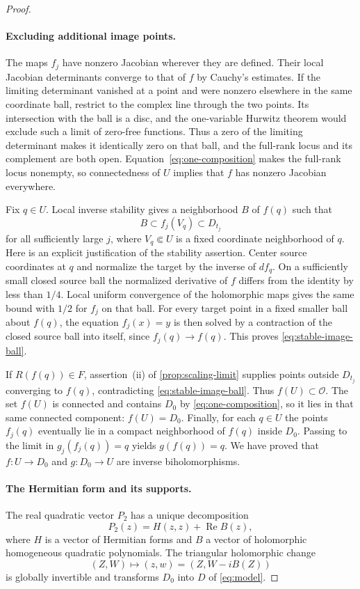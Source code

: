\begin{proof}
\paragraph{Excluding additional image points.}
The maps $f_j$ have nonzero Jacobian wherever they are defined.  Their local Jacobian determinants converge to that of $f$ by Cauchy's estimates. If the limiting determinant vanished at a point and were nonzero elsewhere in the same coordinate ball, restrict to the complex line through the two points. Its intersection with the ball is a disc, and the one-variable Hurwitz theorem would exclude such a limit of zero-free functions. Thus a zero of the limiting determinant makes it identically zero on that ball, and the full-rank locus and its complement are both open. Equation~\eqref{eq:one-composition} makes the full-rank locus nonempty, so connectedness of $U$ implies that $f$ has nonzero Jacobian everywhere.

Fix $q\in U$.  Local inverse stability gives a neighborhood $B$ of $f(q)$ such that
\begin{equation}
\label{eq:stable-image-ball}
 B\subset f_j(V_q)\subset D_{t_j}
\end{equation}
for all sufficiently large $j$, where $V_q\Subset U$ is a fixed coordinate neighborhood of $q$.  Here is an explicit justification of the stability assertion.  Center source coordinates at $q$ and normalize the target by the inverse of $df_q$.  On a sufficiently small closed source ball the normalized derivative of $f$ differs from the identity by less than $1/4$.  Local uniform convergence of the holomorphic maps gives the same bound with $1/2$ for $f_j$ on that ball.  For every target point in a fixed smaller ball about $f(q)$, the equation $f_j(x)=y$ is then solved by a contraction of the closed source ball into itself, since $f_j(q)\to f(q)$.  This proves \eqref{eq:stable-image-ball}.

If $R(f(q))\in F$, assertion~\textup{(ii)} of \cref{prop:scaling-limit} supplies points outside $D_{t_j}$ converging to $f(q)$, contradicting \eqref{eq:stable-image-ball}.  Thus $f(U)\subset\mathcal{O}$. The set $f(U)$ is connected and contains $D_0$ by \eqref{eq:one-composition}, so it lies in that same connected component: $f(U)=D_0$.  Finally, for each $q\in U$ the points $f_j(q)$ eventually lie in a compact neighborhood of $f(q)$ inside $D_0$. Passing to the limit in $g_j(f_j(q))=q$ yields $g(f(q))=q$.  We have proved that $f:U\to D_0$ and $g:D_0\to U$ are inverse biholomorphisms.

\paragraph{The Hermitian form and its supports.}
The real quadratic vector $P_2$ has a unique decomposition
\[
 P_2(z)=H(z,z)+\operatorname{Re}B(z),
\]
where $H$ is a vector of Hermitian forms and $B$ a vector of holomorphic homogeneous quadratic polynomials.  The triangular holomorphic change
\[
 (Z,W)\longmapsto(z,w)=(Z,W-iB(Z))
\]
is globally invertible and transforms $D_0$ into $D$ of \eqref{eq:model}.


\end{proof}
